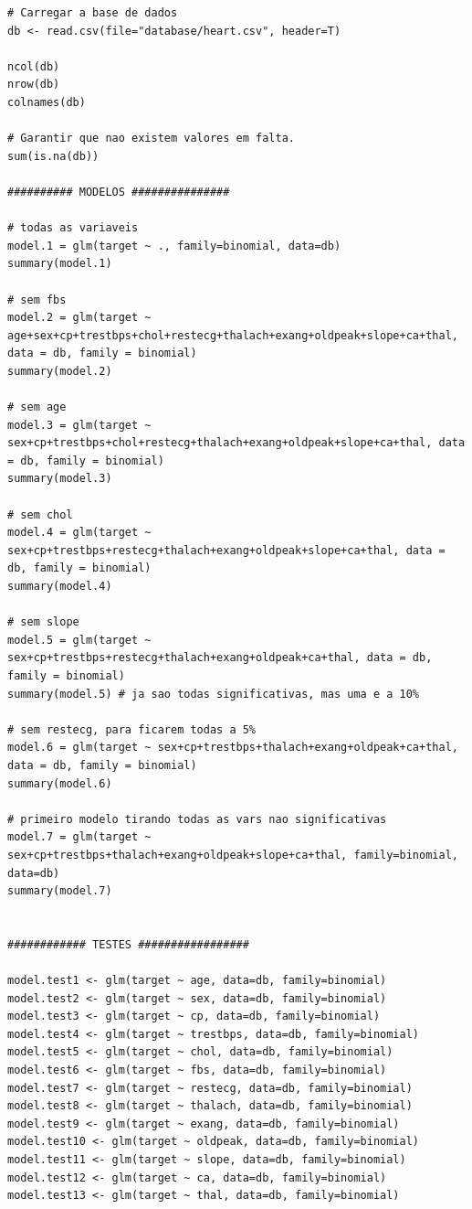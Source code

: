 \documentclass[a4paper]{report}
\begin{document}
\begin{lstlisting}[breaklines,basicstyle=\small]
# Carregar a base de dados
db <- read.csv(file="database/heart.csv", header=T)

ncol(db)
nrow(db)
colnames(db)

# Garantir que nao existem valores em falta.
sum(is.na(db))

########## MODELOS ###############

# todas as variaveis
model.1 = glm(target ~ ., family=binomial, data=db)
summary(model.1)

# sem fbs
model.2 = glm(target ~ age+sex+cp+trestbps+chol+restecg+thalach+exang+oldpeak+slope+ca+thal, data = db, family = binomial)
summary(model.2)

# sem age
model.3 = glm(target ~ sex+cp+trestbps+chol+restecg+thalach+exang+oldpeak+slope+ca+thal, data = db, family = binomial)
summary(model.3) 

# sem chol
model.4 = glm(target ~ sex+cp+trestbps+restecg+thalach+exang+oldpeak+slope+ca+thal, data = db, family = binomial)
summary(model.4)

# sem slope
model.5 = glm(target ~ sex+cp+trestbps+restecg+thalach+exang+oldpeak+ca+thal, data = db, family = binomial)
summary(model.5) # ja sao todas significativas, mas uma e a 10%

# sem restecg, para ficarem todas a 5%
model.6 = glm(target ~ sex+cp+trestbps+thalach+exang+oldpeak+ca+thal, data = db, family = binomial)
summary(model.6) 

# primeiro modelo tirando todas as vars nao significativas
model.7 = glm(target ~ sex+cp+trestbps+thalach+exang+oldpeak+slope+ca+thal, family=binomial, data=db)
summary(model.7)


############ TESTES #################

model.test1 <- glm(target ~ age, data=db, family=binomial)
model.test2 <- glm(target ~ sex, data=db, family=binomial)
model.test3 <- glm(target ~ cp, data=db, family=binomial)
model.test4 <- glm(target ~ trestbps, data=db, family=binomial)
model.test5 <- glm(target ~ chol, data=db, family=binomial)
model.test6 <- glm(target ~ fbs, data=db, family=binomial)
model.test7 <- glm(target ~ restecg, data=db, family=binomial)
model.test8 <- glm(target ~ thalach, data=db, family=binomial)
model.test9 <- glm(target ~ exang, data=db, family=binomial)
model.test10 <- glm(target ~ oldpeak, data=db, family=binomial)
model.test11 <- glm(target ~ slope, data=db, family=binomial)
model.test12 <- glm(target ~ ca, data=db, family=binomial)
model.test13 <- glm(target ~ thal, data=db, family=binomial)


\end{lstlisting}
\end{document}
